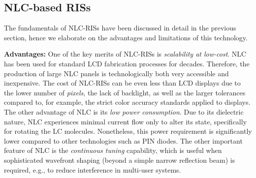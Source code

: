 \subsection{\gls{NLC}-based \glspl{RIS}}
The fundamentals of \gls{NLC}-\glspl{RIS} have been discussed in detail in the previous section, hence we elaborate on the advantages and limitations of this technology. 

{\bf Advantages:} 
One of the key merits of \gls{NLC}-\glspl{RIS} is {\it scalability at low-cost}. \gls{NLC} has been used for standard \gls{LCD} fabrication processes for decades. 
Therefore, the production of large \gls{NLC} panels is technologically both very accessible and inexpensive. 
The cost of \gls{NLC}-\glspl{RIS} can be even less than \gls{LCD} displays due to the lower number of \textit{pixels}, the lack of backlight, as well as the larger tolerances compared to, for example, the strict color accuracy standards applied to displays. %
The other advantage of \gls{NLC} is its {\it low power consumption}.
Due to its dielectric nature, \gls{NLC} experiences minimal current flow only to alter its state, specifically for rotating the LC molecules. Nonetheless, this power requirement is significantly lower compared to other technologies such as \gls{PIN} diodes. 
The other important feature of \gls{NLC} is the {\it continuous tuning} capability, which is useful when sophisticated wavefront shaping (beyond a simple narrow reflection beam) is required, e.g., to reduce interference in multi-user systems.

